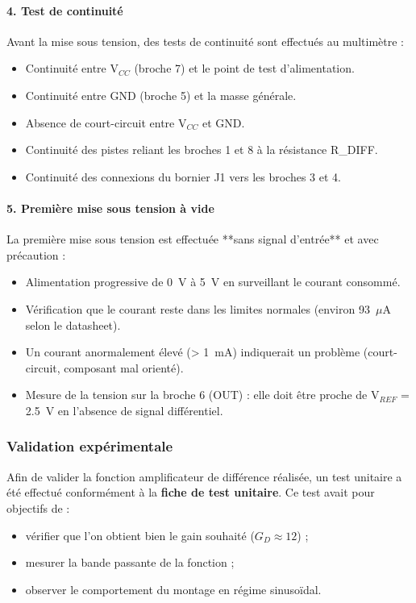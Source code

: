 \documentclass{article}
\begin{document}
\paragraph{4. Test de continuité}

Avant la mise sous tension, des tests de continuité sont effectués au multimètre :
\begin{itemize}
    \item Continuité entre V$_{CC}$ (broche 7) et le point de test d'alimentation.
    \item Continuité entre GND (broche 5) et la masse générale.
    \item Absence de court-circuit entre V$_{CC}$ et GND.
    \item Continuité des pistes reliant les broches 1 et 8 à la résistance R\_DIFF.
    \item Continuité des connexions du bornier J1 vers les broches 3 et 4.
\end{itemize}

\paragraph{5. Première mise sous tension à vide}

La première mise sous tension est effectuée **sans signal d'entrée** et avec précaution :
\begin{itemize}
    \item Alimentation progressive de 0~V à 5~V en surveillant le courant consommé.
    \item Vérification que le courant reste dans les limites normales (environ 93~$\mu$A selon le datasheet).
    \item Un courant anormalement élevé (> 1~mA) indiquerait un problème (court-circuit, composant mal orienté).
    \item Mesure de la tension sur la broche 6 (OUT) : elle doit être proche de V$_{REF}$ = 2.5~V en l'absence de signal différentiel.
\end{itemize}

\subsubsection{Validation expérimentale}

Afin de valider la fonction amplificateur de différence réalisée, un test unitaire a été effectué conformément à la \textbf{fiche de test unitaire}.  
Ce test avait pour objectifs de :
\begin{itemize}
    \item vérifier que l'on obtient bien le gain souhaité ($G_D \approx 12$) ;
    \item mesurer la bande passante de la fonction ;
    \item observer le comportement du montage en régime sinusoïdal.
\end{itemize}
\end{document}
